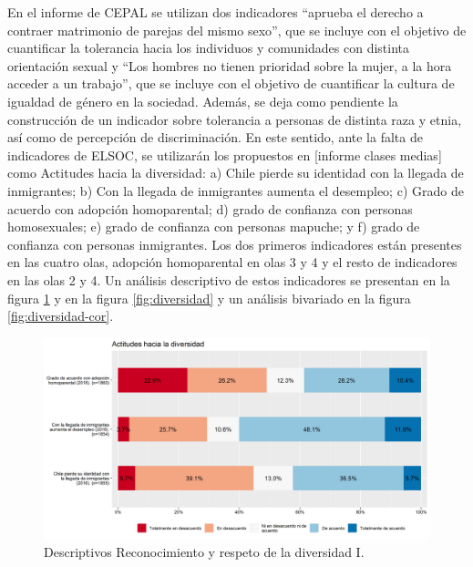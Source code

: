 \documentclass[
  12pt,
]{book}
\begin{document}
En el informe de CEPAL se utilizan dos indicadores ``aprueba el derecho a contraer matrimonio de parejas del mismo sexo'', que se incluye con el objetivo de cuantificar la tolerancia hacia los individuos y comunidades con distinta orientación sexual y ``Los hombres no tienen prioridad sobre la mujer, a la hora acceder a un trabajo'', que se incluye con el objetivo de cuantificar la cultura de igualdad de género en la sociedad. Además, se deja como pendiente la construcción de un indicador sobre tolerancia a personas de distinta raza y etnia, así como de percepción de discriminación. En este sentido, ante la falta de indicadores de ELSOC, se utilizarán los propuestos en {[}informe clases medias{]} como Actitudes hacia la diversidad: a) Chile pierde su identidad con la llegada de inmigrantes; b) Con la llegada de inmigrantes aumenta el desempleo; c) Grado de acuerdo con adopción homoparental; d) grado de confianza con personas homosexuales; e) grado de confianza con personas mapuche; y f) grado de confianza con personas inmigrantes. Los dos primeros indicadores están presentes en las cuatro olas, adopción homoparental en olas 3 y 4 y el resto de indicadores en las olas 2 y 4. Un análisis descriptivo de estos indicadores se presentan en la figura \ref{fig:prejuicios} y en la figura \ref{fig:diversidad} y un análisis bivariado en la figura \ref{fig:diversidad-cor}.

\begin{figure}[H]

{\centering \includegraphics[width=1\linewidth,height=1\textheight]{output/graphs/prejuicios} 

}

\caption{Descriptivos Reconocimiento y respeto de la diversidad I.}\label{fig:prejuicios}
\end{figure}
\end{document}

